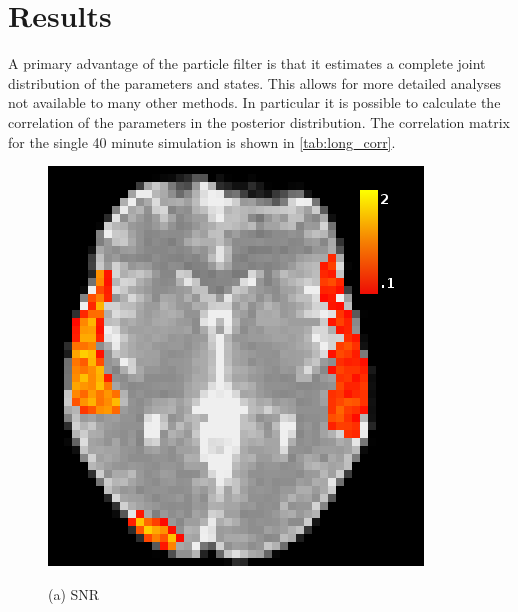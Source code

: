 \documentclass{article}
\begin{document}
\section{Results}
\label{sec:Results}
A primary advantage of the particle filter is that it estimates
a complete joint distribution of the parameters and states. This 
allows for more detailed analyses not available to many other methods.
In particular it is possible to calculate the correlation of the
parameters in the posterior distribution. The correlation matrix
for the single 40 minute simulation is shown in \autoref{tab:long_corr}.
\begin{figure}
\begin{minipage}[b]{.5\linewidth}
  \centering
  \centerline{\includegraphics[width=\textwidth]{snr_hm.png}}
  \centerline{(a) SNR}\medskip
\end{minipage}
\hfill
\begin{minipage}[b]{.49\linewidth}
  \centering

\end{minipage}
\end{figure}
\end{document}
